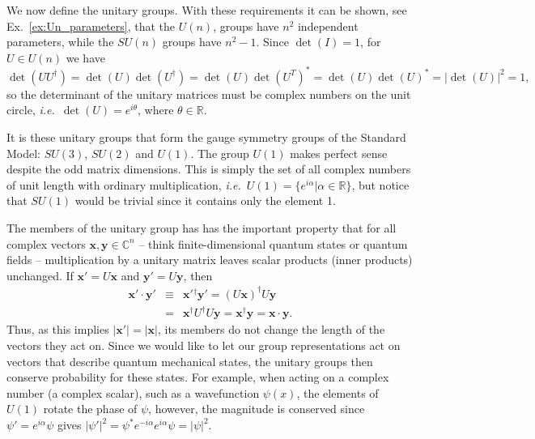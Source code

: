 \documentclass[notes.tex]{subfiles}
\begin{document}
We now define the unitary groups.
With these requirements it can be shown, see Ex.~\ref{ex:Un_parameters}, that the $U(n)$, groups have $n^2$ independent parameters, while the $SU(n)$ groups have $n^2-1$. Since $\det(I)=1$, for $U\in U(n)$ we have
\[\det(UU^\dagger)=\det(U)\det(U^\dagger)=\det(U)\det(U^T)^*=\det(U)\det(U)^*=|\det(U)|^2=1,\] 
so the determinant of the unitary matrices must be complex numbers on the unit circle, {\it i.e.}\ $\det(U)=e^{i\theta}$, where $\theta\in\mathbb R$.

It is these unitary groups that form the gauge symmetry groups of the Standard Model: $SU(3)$, $SU(2)$ and $U(1)$. The group $U(1)$ makes perfect sense despite the odd matrix dimensions. This is simply the set of all complex numbers of unit length with ordinary multiplication, {\it i.e.}\ $U(1)=\{e^{i\alpha} | \alpha \in\mathbb{R} \}$, but notice that $SU(1)$ would be trivial since it contains only the element 1. 

The members of the unitary group has has the important property that for all complex vectors $\mathbf{x}, \mathbf{y} \in \mathbb{C}^n$ -- think finite-dimensional quantum states or quantum fields -- multiplication by  a unitary matrix leaves scalar products (inner products) unchanged. If $\mathbf{x}'=U\mathbf{x}$ and $\mathbf{y}'=U\mathbf{y}$, then
\begin{eqnarray}
\mathbf{x}'\cdot \mathbf{y}' &\equiv& \mathbf{x}'{}^\dagger \mathbf{y}' = (U\mathbf{x})^\dagger U\mathbf{y}\nonumber\\
&=& \mathbf{x}^\dagger U^\dagger U\mathbf{y} = \mathbf{x}^\dagger \mathbf{y} = \mathbf{x} \cdot \mathbf{y}.\nonumber
\end{eqnarray}
Thus, as this implies $|\mathbf{x}'|=|\mathbf{x}|$, its members do not change the length of the vectors they act on.  Since we would like to let our group representations act on vectors that describe quantum mechanical states, the unitary groups then conserve probability for these states. For example, when acting on a complex number (a complex scalar), such as a wavefunction $\psi(x)$, the elements of $U(1)$ rotate the phase of $\psi$, however, the magnitude is conserved since $\psi'=e^{i\alpha}\psi$ gives $|\psi'|^2=\psi^*e^{-i\alpha}e^{i\alpha}\psi=|\psi|^2$.
\end{document}

